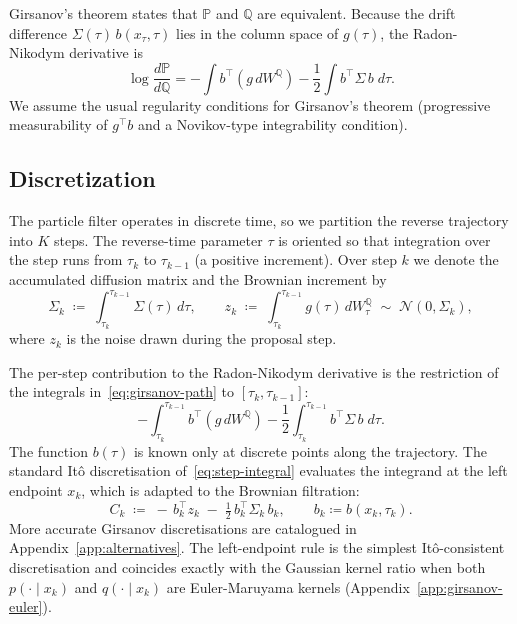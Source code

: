 \documentclass[11pt]{article}
\newcommand{\bbP}{\mathbb{P}}
\newcommand{\bbQ}{\mathbb{Q}}
\begin{document}
Girsanov's theorem \citep[Theorem~8.6.6]{ksendal} states that $\bbP$ and $\bbQ$ are
equivalent.  Because the drift difference $\Sigma(\tau)\,b(x_\tau,\tau)$ lies
in the column space of $g(\tau)$, the Radon-Nikodym derivative is
\begin{equation}\label{eq:girsanov-path}
  \log\frac{d\bbP}{d\bbQ}
    = -\int b^\top (g\,dW^{\bbQ})
      - \frac12\int b^\top\Sigma\,b\;d\tau.
\end{equation}
We assume the usual regularity conditions for Girsanov's theorem
(progressive measurability of $g^\top b$ and a Novikov-type integrability condition).

\subsection{Discretization}

The particle filter operates in discrete time, so we partition the reverse trajectory
into $K$ steps.
The reverse-time parameter $\tau$ is oriented so that integration over the step
runs from $\tau_k$ to $\tau_{k-1}$ (a positive increment).
Over step $k$ we denote the accumulated diffusion matrix and the Brownian increment by
\begin{equation}\label{eq:delta}
  \Sigma_k \;\coloneqq\; \int_{\tau_k}^{\tau_{k-1}} \Sigma(\tau)\,d\tau,
  \qquad
  z_k \;\coloneqq\; \int_{\tau_k}^{\tau_{k-1}} g(\tau)\,dW^{\bbQ}_\tau
  \;\sim\; \mathcal{N}(0,\Sigma_k),
\end{equation}
where $z_k$ is the noise drawn during the proposal step.

The per-step contribution to the Radon-Nikodym derivative is the restriction of the
integrals in~\eqref{eq:girsanov-path} to $[\tau_k, \tau_{k-1}]$:
\begin{equation}\label{eq:step-integral}
  -\int_{\tau_k}^{\tau_{k-1}} b^\top (g\,dW^{\bbQ})
  - \frac12\int_{\tau_k}^{\tau_{k-1}} b^\top\Sigma\,b\;d\tau.
\end{equation}
The function $b(\tau)$ is known only at discrete points along the trajectory.
The standard It\^o discretisation of~\eqref{eq:step-integral} evaluates the
integrand at the left endpoint $x_k$, which is adapted to the Brownian filtration:
\begin{equation}\label{eq:girsanov}
  C_k \;\coloneqq\; -\,b_k^\top z_k \;-\; \tfrac12\,b_k^\top\Sigma_k\,b_k,
  \qquad b_k \coloneqq b(x_k, \tau_k).
\end{equation}
More accurate Girsanov discretisations are catalogued in Appendix~\ref{app:alternatives}.
The left-endpoint rule is the simplest It\^o-consistent discretisation and coincides
exactly with the Gaussian kernel ratio when both $p(\cdot\mid x_k)$ and
$q(\cdot\mid x_k)$ are Euler-Maruyama kernels
(Appendix~\ref{app:girsanov-euler}).
\end{document}
